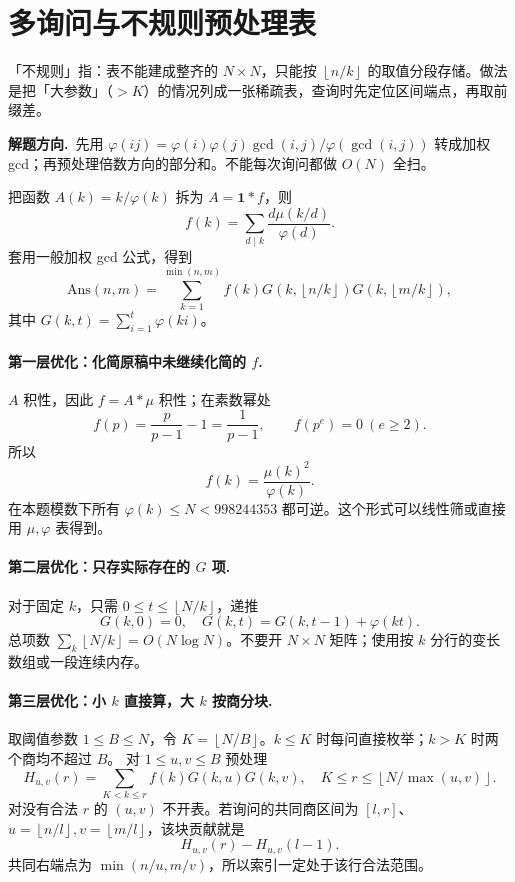 \documentclass[UTF8,a4paper,11pt,twoside,openright,fontset=fandol]{ctexbook}
\theoremstyle{definition}
\newcommand{\one}{\mathbf 1}
\newcommand{\floor}[1]{\left\lfloor #1\right\rfloor}
\newcommand{\hint}{\par\noindent\textbf{解题方向.}\ }
\begin{document}
\section{多询问与不规则预处理表}
\begin{tip}[词义：不规则的预处理表]
「不规则」指：表不能建成整齐的 $N\times N$，只能按 $\floor{n/k}$ 的取值分段存储。做法是把「大参数」（$>K$）的情况列成一张稀疏表，查询时先定位区间端点，再取前缀差。
\end{tip}

\hint 先用 $\varphi(ij)=\varphi(i)\varphi(j)\gcd(i,j)/\varphi(\gcd(i,j))$ 转成加权 gcd；再预处理倍数方向的部分和。不能每次询问都做 $O(N)$ 全扫。

把函数 $A(k)=k/\varphi(k)$ 拆为 $A=\one*f$，则
\[
 f(k)=\sum_{d\mid k}\frac{d\mu(k/d)}{\varphi(d)}.
\]
套用一般加权 gcd 公式，得到
\[
\boxed{\mathrm{Ans}(n,m)=\sum_{k=1}^{\min(n,m)}f(k)
G\left(k,\floor{n/k}\right)G\left(k,\floor{m/k}\right)},
\]
其中 $G(k,t)=\sum_{i=1}^t\varphi(ki)$。

\paragraph{第一层优化：化简原稿中未继续化简的 $f$.}
$A$ 积性，因此 $f=A*\mu$ 积性；在素数幂处
\[
 f(p)=\frac p{p-1}-1=\frac1{p-1},\qquad
 f(p^e)=0\ (e\ge2).
\]
所以
\[
 f(k)=\frac{\mu(k)^2}{\varphi(k)}.
\]
在本题模数下所有 $\varphi(k)\le N<998244353$ 都可逆。这个形式可以线性筛或直接用 $\mu,\varphi$ 表得到。

\paragraph{第二层优化：只存实际存在的 $G$ 项.}
对于固定 $k$，只需 $0\le t\le\floor{N/k}$，递推
\[
 G(k,0)=0,\quad G(k,t)=G(k,t-1)+\varphi(kt).
\]
总项数 $\sum_k\floor{N/k}=O(N\log N)$。不要开 $N\times N$ 矩阵；使用按 $k$ 分行的变长数组或一段连续内存。

\paragraph{第三层优化：小 $k$ 直接算，大 $k$ 按商分块.}
取阈值参数 $1\le B\le N$，令 $K=\floor{N/B}$。$k\le K$ 时每问直接枚举；$k>K$ 时两个商均不超过 $B$。
对 $1\le u,v\le B$ 预处理
\[
 H_{u,v}(r)=\sum_{K<k\le r}f(k)G(k,u)G(k,v),
 \quad K\le r\le\floor{N/\max(u,v)}.
\]
对没有合法 $r$ 的 $(u,v)$ 不开表。若询问的共同商区间为 $[l,r]$、$u=\floor{n/l},v=\floor{m/l}$，该块贡献就是
\[
 H_{u,v}(r)-H_{u,v}(l-1).
\]
共同右端点为 $\min(n/u,m/v)$，所以索引一定处于该行合法范围。
\end{document}

